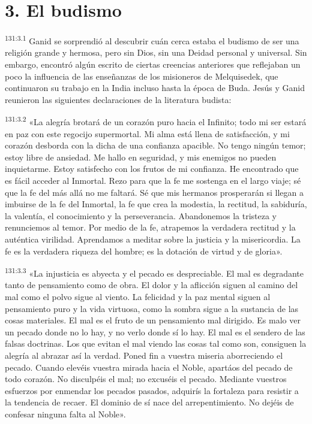 \section*{3. El budismo}
\par 
\textsuperscript{131:3.1} Ganid se sorprendió al descubrir cuán cerca estaba el budismo de ser una religión grande y hermosa, pero sin Dios, sin una Deidad personal y universal. Sin embargo, encontró algún escrito de ciertas creencias anteriores que reflejaban un poco la influencia de las enseñanzas de los misioneros de Melquisedek, que continuaron su trabajo en la India incluso hasta la época de Buda. Jesús y Ganid reunieron las siguientes declaraciones de la literatura budista:

\par 
\textsuperscript{131:3.2} «La alegría brotará de un corazón puro hacia el Infinito; todo mi ser estará en paz con este regocijo supermortal. Mi alma está llena de satisfacción, y mi corazón desborda con la dicha de una confianza apacible. No tengo ningún temor; estoy libre de ansiedad. Me hallo en seguridad, y mis enemigos no pueden inquietarme. Estoy satisfecho con los frutos de mi confianza. He encontrado que es fácil acceder al Inmortal. Rezo para que la fe me sostenga en el largo viaje; sé que la fe del más allá no me faltará. Sé que mis hermanos prosperarán si llegan a imbuirse de la fe del Inmortal, la fe que crea la modestia, la rectitud, la sabiduría, la valentía, el conocimiento y la perseverancia. Abandonemos la tristeza y renunciemos al temor. Por medio de la fe, atrapemos la verdadera rectitud y la auténtica virilidad. Aprendamos a meditar sobre la justicia y la misericordia. La fe es la verdadera riqueza del hombre; es la dotación de virtud y de gloria».

\par 
\textsuperscript{131:3.3} «La injusticia es abyecta y el pecado es despreciable. El mal es degradante tanto de pensamiento como de obra. El dolor y la aflicción siguen al camino del mal como el polvo sigue al viento. La felicidad y la paz mental siguen al pensamiento puro y la vida virtuosa, como la sombra sigue a la sustancia de las cosas materiales. El mal es el fruto de un pensamiento mal dirigido. Es malo ver un pecado donde no lo hay, y no verlo donde sí lo hay. El mal es el sendero de las falsas doctrinas. Los que evitan el mal viendo las cosas tal como son, consiguen la alegría al abrazar así la verdad. Poned fin a vuestra miseria aborreciendo el pecado. Cuando elevéis vuestra mirada hacia el Noble, apartáos del pecado de todo corazón. No disculpéis el mal; no excuséis el pecado. Mediante vuestros esfuerzos por enmendar los pecados pasados, adquirís la fortaleza para resistir a la tendencia de recaer. El dominio de sí nace del arrepentimiento. No dejéis de confesar ninguna falta al Noble».

